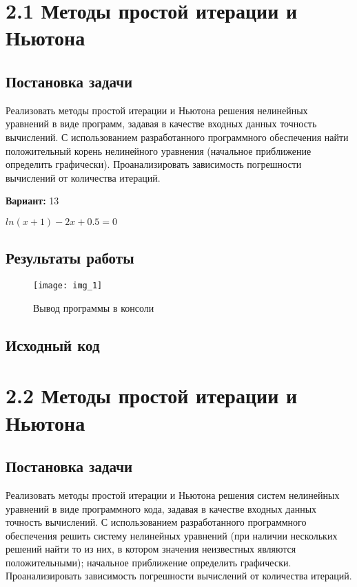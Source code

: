 \section* {2.1  Методы простой итерации и Ньютона}

\subsection{Постановка задачи}
Реализовать методы простой итерации и Ньютона решения нелинейных уравнений в виде программ, задавая в качестве входных данных точность вычислений. С использованием разработанного программного обеспечения найти положительный корень нелинейного уравнения (начальное приближение определить графически). Проанализировать зависимость погрешности вычислений от количества итераций.

{\bfseries Вариант:} 13

$ln(x+1)-2x+0.5=0$

\subsection{Результаты работы}
\begin{figure}[h!]
\centering
\texttt{[image: img\_1]}
\caption{Вывод программы в консоли}
\end{figure}
\pagebreak

\subsection{Исходный код}


\pagebreak

\section* {2.2  Методы простой итерации и Ньютона}

\subsection{Постановка задачи}
Реализовать методы простой итерации и Ньютона решения систем нелинейных уравнений в виде программного кода, задавая в качестве входных данных точность вычислений. С использованием разработанного программного обеспечения решить систему нелинейных уравнений (при наличии нескольких решений найти то из них, в котором значения неизвестных являются положительными); начальное приближение определить графически. Проанализировать зависимость погрешности вычислений от количества итераций. 

